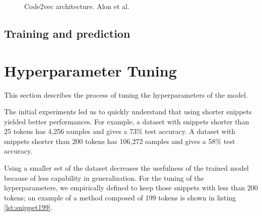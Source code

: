 \begin{figure}
 \centering
 \caption[]{Code2vec architecture. Alon et al. \cite{alon2019code2vec}}
    \label{fig:code2vec_arch}
\end{figure}
 

\subsection{Training and prediction}






\section{Hyperparameter Tuning}

This section describes the process of tuning the hyperparameters of the model.

The initial experiments led us to quickly understand that using shorter snippets yielded better performances.
For example, a dataset with snippets shorter than 25 tokens has 4,256 samples and gives a 73\% test accuracy.
A dataset with snippets shorter than 200 tokens has 106,272 samples and gives a 58\% test accuracy. 


Using a smaller set of the dataset decreases the usefulness of the trained model because of less capability in generalization.
For the tuning of the hyperparameters, we empirically defined to keep those snippets with less than 200 tokens; an example of a method composed of 199 tokens is shown in listing \ref{lst:snippet199}.

